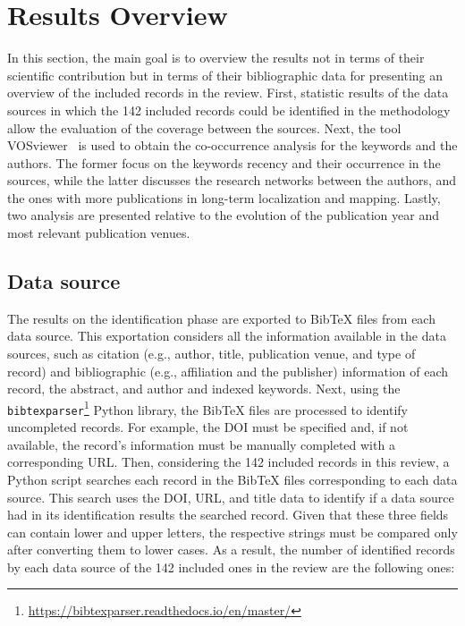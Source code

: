 \section{Results Overview}
\label{sec:overview}

In this section, the main goal is to overview the results not in terms of their scientific contribution but in terms of their bibliographic data for presenting an overview of the included records in the review. First, statistic results of the data sources in which the 142 included records could be identified in the methodology allow the evaluation of the coverage between the sources.
Next, the tool VOSviewer~\parencite{results:vosviewer:1,results:vosviewer:2} is used to obtain the co-occurrence analysis for the keywords and the authors. The former focus on the keywords recency and their occurrence in the sources, while the latter discusses the research networks between the authors, and the ones with more publications in long-term localization and mapping.
Lastly, two analysis are presented relative to the evolution of the publication year and most relevant publication venues.

\subsection{Data source}
\label{sec:overview:db}

The results on the identification phase are exported to BibTeX files from each data source. This exportation considers all the information available in the data sources, such as citation (e.g., author, title, publication venue, and type of record) and bibliographic (e.g., affiliation and the publisher) information of each record, the abstract, and author and indexed keywords. Next, using the \texttt{bibtexparser}\footnote{\url{https://bibtexparser.readthedocs.io/en/master/}} Python library, the BibTeX files are processed to identify uncompleted records. For example, the DOI must be specified and, if not available, the record's information must be manually completed with a corresponding URL. Then, considering the 142 included records in this review, a Python script searches each record in the BibTeX files corresponding to each data source. This search uses the DOI, URL, and title data to identify if a data source had in its identification results the searched record. Given that these three fields can contain lower and upper letters, the respective strings must be compared only after converting them to lower cases. As a result, the number of identified records by each data source of the 142 included ones in the review are the following ones:

